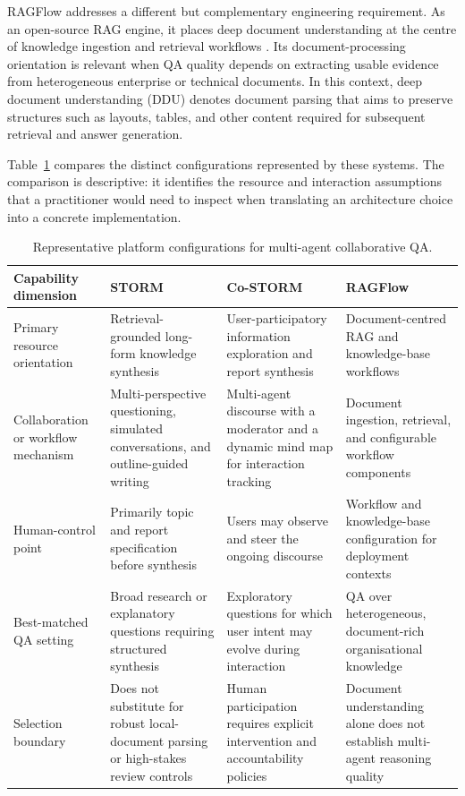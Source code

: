 RAGFlow addresses a different but complementary engineering requirement. As
an open-source RAG engine, it places deep document understanding at the centre
of knowledge ingestion and retrieval workflows \citep{ragflow2024}. Its
document-processing orientation is relevant when QA quality depends on
extracting usable evidence from heterogeneous enterprise or technical
documents. In this context, deep document understanding (DDU) denotes
document parsing that aims to preserve structures such as layouts, tables, and
other content required for subsequent retrieval and answer generation.

Table~\ref{tab:platform_capability_matrix} compares the distinct
configurations represented by these systems. The comparison is descriptive:
it identifies the resource and interaction assumptions that a practitioner
would need to inspect when translating an architecture choice into a concrete
implementation.

\begin{table}[t]
  \centering
  \caption{Representative platform configurations for multi-agent collaborative QA.}
  \label{tab:platform_capability_matrix}
  \small
  \begin{tabularx}{\textwidth}{p{3.0cm} X X X}
    \toprule
    \textbf{Capability dimension} & \textbf{STORM} & \textbf{Co-STORM} & \textbf{RAGFlow} \\
    \midrule
    Primary resource orientation &
    Retrieval-grounded long-form knowledge synthesis &
    User-participatory information exploration and report synthesis &
    Document-centred RAG and knowledge-base workflows \\
    Collaboration or workflow mechanism &
    Multi-perspective questioning, simulated conversations, and outline-guided writing &
    Multi-agent discourse with a moderator and a dynamic mind map for interaction tracking &
    Document ingestion, retrieval, and configurable workflow components \\
    Human-control point &
    Primarily topic and report specification before synthesis &
    Users may observe and steer the ongoing discourse &
    Workflow and knowledge-base configuration for deployment contexts \\
    Best-matched QA setting &
    Broad research or explanatory questions requiring structured synthesis &
    Exploratory questions for which user intent may evolve during interaction &
    QA over heterogeneous, document-rich organisational knowledge \\
    Selection boundary &
    Does not substitute for robust local-document parsing or high-stakes review controls &
    Human participation requires explicit intervention and accountability policies &
    Document understanding alone does not establish multi-agent reasoning quality \\
    \bottomrule
  \end{tabularx}
\end{table}

